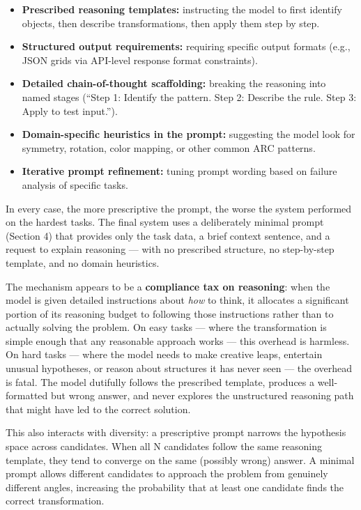 \documentclass[11pt]{article}
\providecommand{\tightlist}{%
  \setlength{\itemsep}{0pt}\setlength{\parskip}{0pt}}
\begin{document}
\begin{itemize}
\tightlist
\item
  \textbf{Prescribed reasoning templates:} instructing the model to
  first identify objects, then describe transformations, then apply them
  step by step.
\item
  \textbf{Structured output requirements:} requiring specific output
  formats (e.g., JSON grids via API-level response format constraints).
\item
  \textbf{Detailed chain-of-thought scaffolding:} breaking the reasoning
  into named stages (``Step 1: Identify the pattern. Step 2: Describe
  the rule. Step 3: Apply to test input.'').
\item
  \textbf{Domain-specific heuristics in the prompt:} suggesting the
  model look for symmetry, rotation, color mapping, or other common ARC
  patterns.
\item
  \textbf{Iterative prompt refinement:} tuning prompt wording based on
  failure analysis of specific tasks.
\end{itemize}

In every case, the more prescriptive the prompt, the worse the system
performed on the hardest tasks. The final system uses a deliberately
minimal prompt (Section 4) that provides only the task data, a brief
context sentence, and a request to explain reasoning --- with no
prescribed structure, no step-by-step template, and no domain
heuristics.

The mechanism appears to be a \textbf{compliance tax on reasoning}: when
the model is given detailed instructions about \emph{how} to think, it
allocates a significant portion of its reasoning budget to following
those instructions rather than to actually solving the problem. On easy
tasks --- where the transformation is simple enough that any reasonable
approach works --- this overhead is harmless. On hard tasks --- where
the model needs to make creative leaps, entertain unusual hypotheses, or
reason about structures it has never seen --- the overhead is fatal. The
model dutifully follows the prescribed template, produces a
well-formatted but wrong answer, and never explores the unstructured
reasoning path that might have led to the correct solution.

This also interacts with diversity: a prescriptive prompt narrows the
hypothesis space across candidates. When all N candidates follow the
same reasoning template, they tend to converge on the same (possibly
wrong) answer. A minimal prompt allows different candidates to approach
the problem from genuinely different angles, increasing the probability
that at least one candidate finds the correct transformation.
\end{document}
